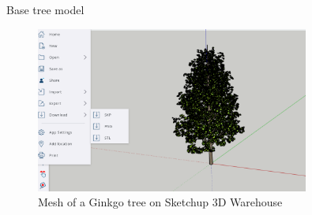 \documentclass[10pt]{beamer}
\begin{document}
\begin{frame}{Base tree model}
\begin{figure}[H]
    \centering
        \centering
        \includegraphics[width=0.8\textwidth]{images/ginkgo_sketchup.png}
        \caption{Mesh of a Ginkgo tree on Sketchup 3D Warehouse}
\end{figure}
\end{frame}
\end{document}
